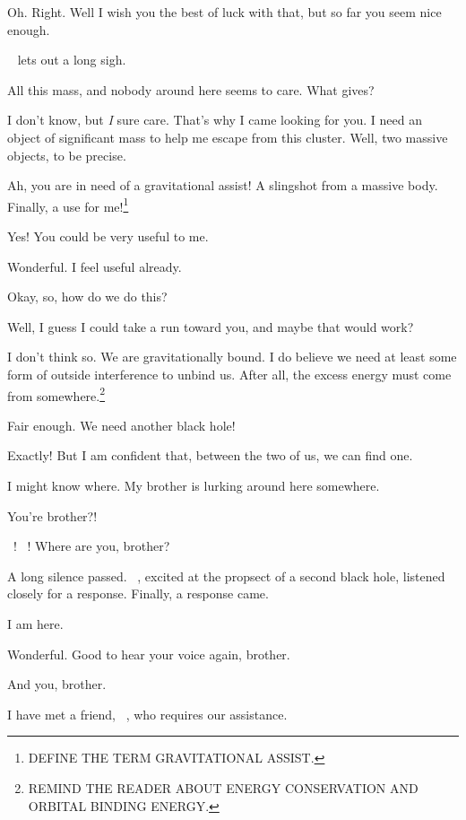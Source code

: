 \documentclass[main.tex]{subfiles}
\begin{document}
\newpara \Sterope Oh.  Right.  Well I wish you the best of luck with that, but so far you seem nice enough.

\newpara \nar \rmares~ lets out a long sigh.

\newpara \Ares All this mass, and nobody around here seems to care.  What gives?

\newpara \Sterope I don't know, but \textit{I} sure care.  That's why I came looking for you.  I need an object of significant mass to help me escape from this cluster.  Well, two massive objects, to be precise.  

\newpara \Ares Ah, you are in need of a gravitational assist!  A slingshot from a massive body.  Finally, a use for me!\footnote{DEFINE THE TERM GRAVITATIONAL ASSIST.}

\newpara \Sterope Yes!  You could be very useful to me.  

\newpara \Ares Wonderful.  I feel useful already.

\newpara \Sterope Okay, so, how do we do this?

\newpara \Ares Well, I guess I could take a run toward you, and maybe that would work?

\newpara \Sterope I don't think so.  We are gravitationally bound.  I do believe we need at least some form of outside interference to unbind us.  After all, the excess energy must come from somewhere.\footnote{REMIND THE READER ABOUT ENERGY CONSERVATION AND ORBITAL BINDING ENERGY.}

\newpara \Ares Fair enough.  We need another black hole!

\newpara \Sterope Exactly!  But I am confident that, between the two of us, we can find one.

\newpara \Ares I might know where.  My brother is lurking around here somewhere. 

\newpara \Sterope You're brother?!

\newpara \Ares \rmzeus~! \rmzeus~!  Where are you, brother?

\newpara \nar A long silence passed.  \rmsterope~, excited at the propsect of a second black hole, listened closely for a response.  Finally, a response came.

\newpara \Zeus I am here.   

\newpara \Ares  Wonderful.  Good to hear your voice again, brother.

\newpara \Zeus And you, brother.

\newpara \Ares I have met a friend, \rmsterope~, who requires our assistance.
\end{document}
